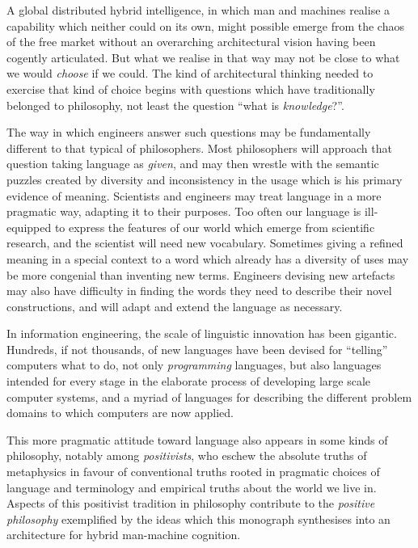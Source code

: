 A global distributed hybrid intelligence, in which man and machines realise a capability which neither could on its own, might possible emerge from the chaos of the free market without an overarching architectural vision having been cogently articulated.
But what we realise in that way may not be close to what we would {\it choose} if we could.
The kind of architectural thinking needed to exercise that kind of choice begins with questions which have traditionally belonged to philosophy, not least the question ``what is {\it knowledge}?''.

The way in which engineers answer such questions may be fundamentally different to that typical of philosophers.
Most philosophers will approach that question taking language as {\it given}, and may then wrestle with the semantic puzzles created by diversity and inconsistency in the usage which is his primary evidence of meaning.
Scientists and engineers may treat language in a more pragmatic way, adapting it to their purposes.
Too often our language is ill-equipped to express the features of our world which emerge from scientific research, and the scientist will need new vocabulary.
Sometimes giving a refined meaning in a special context to a word which already has a diversity of uses may be more congenial than inventing new terms.
Engineers devising new artefacts may also have difficulty in finding the words they need to describe their novel constructions, and will adapt and extend the language as necessary.

In information engineering, the scale of linguistic innovation has been gigantic.
Hundreds, if not thousands, of new languages have been devised for ``telling'' computers what to do, not only {\it programming} languages, but also languages intended for every stage in the elaborate process of developing large scale computer systems, and a myriad of languages for describing the different problem domains to which computers are now applied.

This more pragmatic attitude toward language also appears in some kinds of philosophy, notably among {\it positivists}, who eschew the absolute truths of metaphysics in favour of conventional truths rooted in pragmatic choices of language and terminology and empirical truths about the world we live in.
Aspects of this positivist tradition in philosophy contribute to the {\it positive philosophy} exemplified by the ideas which this monograph synthesises into an architecture for hybrid man-machine cognition.

\mainmatter
